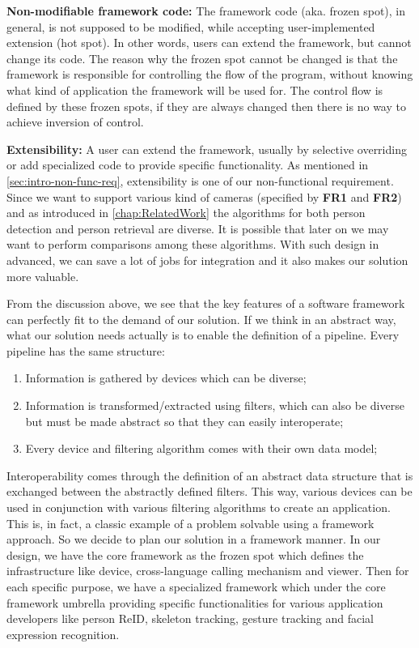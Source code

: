 \noindent \textbf{Non-modifiable framework code:}
The framework code (aka. frozen spot), in general, is not supposed to be
modified, while accepting user-implemented extension (hot spot). In other
words, users can extend the framework, but cannot change its code.
%
The reason why the frozen spot cannot be changed is that the framework is
responsible for controlling the flow of the program, without knowing what
kind of application the framework will be used for. The control flow is defined
by these frozen spots, if they are always changed then there is no way to
achieve inversion of control.

\noindent \textbf{Extensibility:}
A user can extend the framework, usually by selective overriding or add
specialized code to provide specific functionality.
%
As mentioned in \autoref{sec:intro-non-func-req}, extensibility is one of our
non-functional requirement. Since we want to support various kind of cameras
(specified by \textbf{FR1} and \textbf{FR2})
and as introduced in \autoref{chap:RelatedWork} the algorithms for both person
detection and person retrieval are diverse. It is possible that later on we may
want to perform comparisons among these algorithms. With such design in advanced,
we can save a lot of jobs for integration and it also makes our solution more
valuable.

From the discussion above, we see that the key features of a software framework can
perfectly fit to the demand of our solution. If we think in an abstract way,
what our solution needs actually is to enable the definition of a pipeline.
Every pipeline has the same structure:
\begin{enumerate}
    \item Information is gathered by devices which can be diverse;

    \item Information is transformed/extracted using filters, which can also be
          diverse but must be made abstract so that they can easily
          interoperate;

    \item Every device and filtering algorithm comes with their own data model;
\end{enumerate}

Interoperability comes through the definition of an abstract data
structure that is exchanged between the abstractly defined filters. This way,
various devices can be used in conjunction with various filtering algorithms to
create an application. This is, in fact, a classic example of a problem solvable
using a framework approach. So we decide to plan our solution in a framework
manner.
In our design, we have the core framework as the frozen spot which
defines the infrastructure like device, cross-language calling mechanism and
viewer.
Then for each specific purpose, we have a specialized framework which under the
core framework umbrella providing specific functionalities for various
application developers like person ReID, skeleton tracking, gesture tracking
and facial expression recognition.

